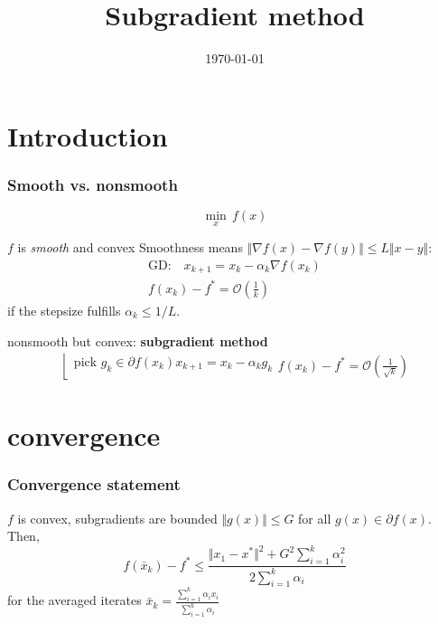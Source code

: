 \documentclass{beamer}
\title{Subgradient method}
\date{\today}
\begin{document}
\maketitle
\frame{\tableofcontents[currentsection]}

\section{Introduction}%

\begin{frame}
  \frametitle{Smooth vs. nonsmooth}

  \begin{equation}
    \min_x \, f(x)
  \end{equation}

  \begin{block}{$f$ is \emph{smooth} and convex}
    Smoothness means $\Vert \nabla f(x) - \nabla f(y) \Vert \le L \Vert x-y \Vert$:
    \begin{equation}
      \begin{aligned}
        \text{GD:} \quad x_{k+1} = x_k - \alpha_k \nabla f(x_k) \\
        f(x_k) - f^* = \mathcal{O}(\frac{1}{k})
      \end{aligned}
    \end{equation}
    if the stepsize fulfills $\alpha_k \le 1/L$.
  \end{block}
  \begin{block}{nonsmooth but convex: \textbf{subgradient method}}
    \begin{equation}
      \begin{aligned}
        \left\lfloor \begin{array}{l}
                 \text{pick $g_k \in \partial f(x_k)$}
                 x_{k+1} = x_k - \alpha_k g_k \\
               \end{array}\right.
        f(x_k) - f^* = \mathcal{O}(\frac{1}{\sqrt{k}})
      \end{aligned}
    \end{equation}
  \end{block}
\end{frame}

\section{convergence}%
\label{sec:}
\begin{frame}
  \frametitle{Convergence statement}
  \begin{theorem}
    $f$ is convex, subgradients are bounded $\Vert g(x) \Vert \le G$ for all $g(x)\in \partial f(x)$. Then,
    \begin{equation}
      f(\bar{x}_k) - f^* \le \frac{\Vert x_1-x^*\Vert^2 + G^2 \sum_{i=1}^{k}\alpha_i^2}{2 \sum_{i=1}^{k}\alpha_i}
    \end{equation}
    for the averaged iterates $\bar{x}_k = \frac{\sum_{i=1}^{k} \alpha_i x_i }{\sum_{i=1}^{k} \alpha_i}$
  \end{theorem}
\end{frame}
\end{document}
